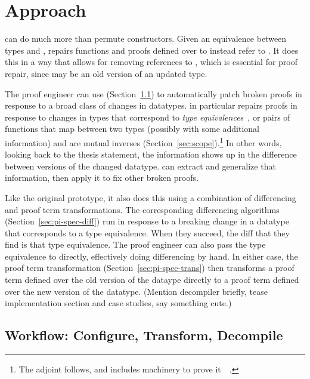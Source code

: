 \section{Approach}


\toolnamec can do much more than permute constructors.
Given an equivalence between types \Aa and \B,
\toolnamec repairs functions and proofs defined over \Aa to instead refer to \B.
It does this in a way that allows for removing references to \Aa, which is essential for proof repair,
since \Aa may be an old version of an updated type.

The proof engineer can use \toolnamec (Section~\ref{sec:pi-workflow}) to automatically patch broken proofs in response to a broad class of changes in datatypes.
\toolnamec in particular repairs proofs in response to changes in types that correspond to \textit{type equivalences}~\cite{univalent2013homotopy},
or pairs of functions that map between two types (possibly with some additional information) and are mutual inverses (Section~\ref{sec:scope}).\footnote{The adjoint follows, and \toolnamec includes machinery to prove it~\href{https://github.com/uwplse/pumpkin-pi/blob/v2.0.0/plugin/src/automation/search/equivalence.ml}{}~\href{https://github.com/uwplse/pumpkin-pi/blob/v2.0.0/plugin/theories/Adjoint.v}{}.}
In other words, looking back to the thesis statement, the information shows up in the difference between versions of the changed datatype.
\toolnamec can extract and generalize that information, then apply it to fix other broken proofs.

Like the original \sysname prototype, it also does this using a combination of differencing and proof term transformations.
The corresponding differencing algorithms (Section~\ref{sec:pi-spec-diff}) run in response to a breaking change in a datatype that corresponds to a type equivalence.
When they succeed, the diff that they find is that type equivalence.
The proof engineer can also pass the type equivalence to \toolnamec directly, effectively doing differencing by hand.
In either case, the proof term transformation (Section~\ref{sec:pi-spec-trans}) then transforms a proof term defined over the old version of the dataype
directly to a proof term defined over the new version of the datatype.
(Mention decompiler briefly, tease implementation section and case studies, say something cute.)

\subsection{Workflow: Configure, Transform, Decompile}
\label{sec:pi-workflow}

